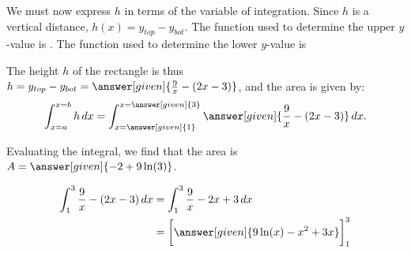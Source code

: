 \documentclass{ximera}
\begin{document}
\begin{example}
\begin{explanation}
We must now express $h$ in terms of the variable of integration.  Since $h$ is a vertical distance, $h(x)=y_{top}-y_{bot}$.  The function used to determine the upper $y$-value is .  The function used to determine the lower $y$-value is 

The height $h$ of the rectangle is thus $h=y_{top}-y_{bot} = \answer[given]{\frac{9}{x}-(2x-3)}$, and the area is given by:
  \[
 \int_{x=a}^{x=b} h \d x =  \int_{x=\answer[given]{1}}^{x=\answer[given]{3}} \answer[given]{\frac{9}{x}-(2x-3)} \d x .  \]
  
 Evaluating the integral, we find that the area is $A= \answer[given]{-2+9 \ln(3)}$.
  \begin{hint}
    \begin{align*}
      \int_1^3 \frac{9}{x}-(2x-3) \d x &= \int_1^3 \frac{9}{x}-2x+3 \d x\\
      &=\eval{\answer[given]{9\ln(x)-x^2+3x}}_1^3\\
    \end{align*}
  \end{hint}
\end{explanation}
\end{example}
\end{document}
